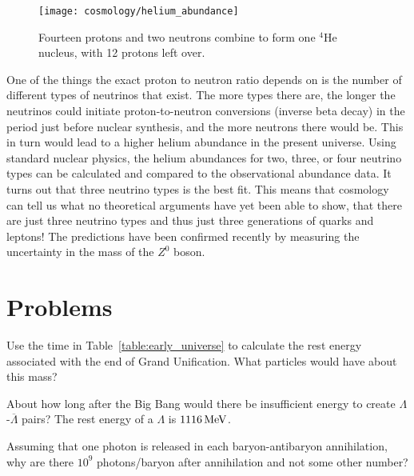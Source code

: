\begin{figure}[tbp]
\begin{center}
\texttt{[image: cosmology/helium\_abundance]}
\caption{Fourteen protons and two neutrons combine to form one
  $^4$He nucleus, with 12 protons left over.}
\label{fig:helium_abundance}
\end{center}
\end{figure}

One of the things the exact proton to neutron ratio depends on is the
number of different types of neutrinos that exist.  The more types
there are, the longer the neutrinos could initiate proton-to-neutron
conversions (inverse beta decay) in the period just before nuclear
synthesis, and the more neutrons there would be.  This in turn would
lead to a higher helium abundance in the present universe.  Using
standard nuclear physics, the helium abundances for two, three, or
four neutrino types can be calculated and compared to the
observational abundance data.  It turns out that three neutrino types
is the best fit. This means that cosmology can tell us what no
theoretical arguments have yet been able to show, that there are just
three neutrino types and thus just three generations of quarks and
leptons!  The predictions have been confirmed recently by measuring
the uncertainty in the mass of the $Z^0$ boson.

\newpage

\section*{Problems}

\begin{problem}
Use the time in Table~\ref{table:early_universe} to calculate
  the rest energy associated with the end of Grand Unification.  What
  particles would have about this mass?
\label{prob:grand_unification}
\end{problem}

\begin{problem}
About how long after the Big Bang would there be insufficient
  energy to create $\Lambda$-$\overline\Lambda$ pairs?  The rest
  energy of a $\Lambda$ is $1116\,\mbox{MeV}$.
\label{prob:Lambda_pair_production}
\end{problem}

\begin{problem}
 Assuming that one photon is released in each baryon-antibaryon
  annihilation, why are there $10^9$ photons/baryon after annihilation
  and not some other number?
\label{prob:baryon_abundance}
\end{problem}

